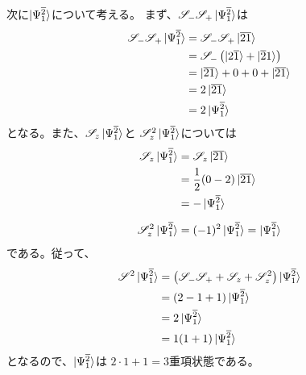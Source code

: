 次に$\ket{\Psi_{{1}}^{{\overline{2}}}}$について考える。
まず、$\mathscr{S}_- \mathscr{S}_+ \ket{\Psi_{{1}}^{{\overline{2}}}}$は
\begin{align}
	\mathscr{S}_- \mathscr{S}_+ \ket{\Psi_{\aorb{1}}^{\borb{2}}}
&=
	\mathscr{S}_- \mathscr{S}_+ \ket{\borb{2}\borb{1}} \\
%
%
&=
	\mathscr{S}_-\left(
		\ket{\aorb{2}\borb{1}}
		+
		\ket{\borb{2}\aorb{1}}
	\right) \\
%
%
&=
	\ket{\borb{2}\borb{1}}
	+
	0
	+
	0
	+
	\ket{\borb{2}\borb{1}} \\
%
%
&=
	2 \ket{\borb{2}\borb{1}} \\
%
%
&=
	2 \ket{\Psi_{\aorb{1}}^{\borb{2}}}
\end{align}
となる。また、$\mathscr{S}_z \ket{\Psi_{{1}}^{{\overline{2}}}}$と
$\mathscr{S}_z^2 \ket{\Psi_{{1}}^{{\overline{2}}}}$については
\begin{align}
	\mathscr{S}_z \ket{\Psi_{\aorb{1}}^{\borb{2}}}
&=
	\mathscr{S}_z \ket{\borb{2}\borb{1}} \\
%
%
&=
	\frac{1}{2} (0-2)
	\ket{\borb{2}\borb{1}} \\
%
%
&=
	- \ket{\Psi_{\aorb{1}}^{\borb{2}}} \\[2mm]
%
%
	\mathscr{S}_z^2 \ket{\Psi_{\aorb{1}}^{\borb{2}}}
&=
	(-1)^2 \ket{\Psi_{\aorb{1}}^{\borb{2}}}
=
	\ket{\Psi_{\aorb{1}}^{\borb{2}}}
\end{align}
である。従って、
\begin{align}
	\mathscr{S}^2 \ket{\Psi_{\aorb{1}}^{\borb{2}}}
&=
	\left(
		\mathscr{S}_- \mathscr{S}_+
		+
		\mathscr{S}_z
		+
		\mathscr{S}_z^2
	\right) \ket{\Psi_{\aorb{1}}^{\borb{2}}} \\
%
%
&=
	(2-1+1) \ket{\Psi_{\aorb{1}}^{\borb{2}}} \\
%
%
&=
	2 \ket{\Psi_{\aorb{1}}^{\borb{2}}} \\
%
%
&=
	1 (1+1) \ket{\Psi_{\aorb{1}}^{\borb{2}}}
\end{align}
となるので、$\ket{\Psi_{{1}}^{{\overline{2}}}}$は
$2\cdot 1+1=3$重項状態である。

